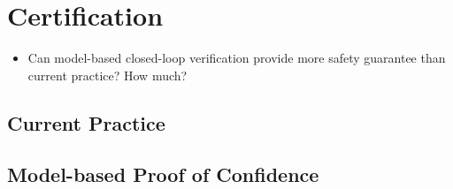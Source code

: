 \documentclass[openany]{now} %
\begin{document}
\chapter{Certification}
\begin{itemize}
          	\item Can model-based closed-loop verification provide more safety guarantee than current practice? How much?
          \end{itemize}
\section{Current Practice}
\section{Model-based Proof of Confidence}
\cite{pancreas}



\backmatter







\end{document}
